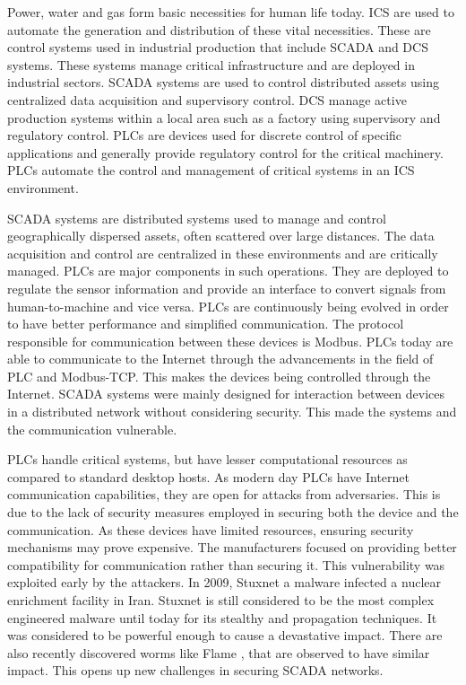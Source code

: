 \documentclass[article,msc=informatik,type=msc,colorback,accentcolor=tud9c]{tudthesis}
\begin{document}
   Power, water and gas form basic necessities for human life today. \ac{ICS} are used to automate the generation and distribution of these vital necessities. These are control systems used in industrial production that include SCADA\cite{boyer2009scada} and DCS\cite{butkovskiy1969distributed} systems. These systems manage critical infrastructure and are deployed in industrial sectors. \ac{SCADA} systems are used to control distributed assets using centralized data acquisition and supervisory control. DCS manage active production systems within a local area such as a factory using supervisory and regulatory control. PLCs are devices used for discrete control of specific applications and generally provide regulatory control for the critical machinery\cite{Webb:1998:PLC:551899}. \ac{PLC}s automate the control and management of critical systems in an \ac{ICS} environment.
   
   
   \vspace{3mm}
   \ac{SCADA} systems are distributed systems  used to manage and control geographically dispersed assets, often scattered over large distances. The data acquisition and control are centralized in these environments and are critically managed. \ac{PLC}s are major components in such operations.
   They are deployed to regulate the sensor information and provide an interface to convert signals from human-to-machine and vice versa. \ac{PLC}s are continuously being evolved in order to have better performance and simplified communication. The protocol responsible for communication between these devices is Modbus\cite{modbus2004modbus}. \ac{PLC}s today are able to communicate to the Internet through the advancements in the field of \ac{PLC} and Modbus-TCP\cite{swales1999open}. This makes the devices being controlled through the Internet. \ac{SCADA} systems were mainly designed for interaction between devices in a distributed network without considering security. This made the systems and the communication vulnerable. 
   
   
   \vspace{3mm}
   \ac{PLC}s handle critical systems, but have lesser computational resources as compared to standard desktop hosts. As modern day \ac{PLC}s have Internet communication capabilities, they are open for attacks from adversaries. This is due to the lack of security measures employed in securing both the device and the communication. As these devices have limited resources, ensuring security mechanisms may prove expensive. The manufacturers focused on providing better compatibility for communication rather than securing it. This vulnerability was exploited early by the attackers. In 2009, Stuxnet\cite{Langner:2011:SDC:1990763.1990881} a malware infected a nuclear enrichment facility in Iran. Stuxnet is still considered to be the most complex engineered malware until today for its stealthy and propagation techniques\cite{zetter2011digital}. It was considered to be powerful enough to cause a devastative impact. There are also recently discovered worms like Flame \cite{virvilis2013big}, that are observed to have similar impact. This opens up new challenges in securing \ac{SCADA} networks. 
   
\end{document}
